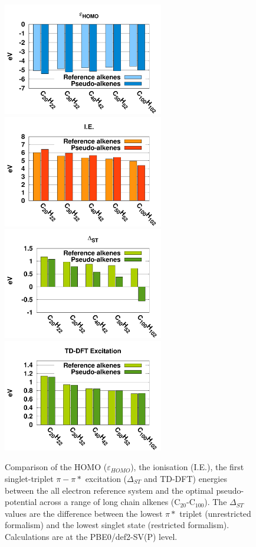 \documentclass[aip,reprint]{revtex4-1}
\begin{document}
\begin{figure}
\begin{center}
\includegraphics[width=7cm]{long_pbe0_homo}
\includegraphics[width=7cm]{long_pbe0_ie}
\includegraphics[width=7cm]{long_pbe0_st}
\includegraphics[width=7cm]{long_pbe0_tddft}
\end{center}

\caption{Comparison of the HOMO ($\varepsilon_{HOMO}$),
the ionisation (I.E.),
the first singlet-triplet $\pi-\pi*$ excitation ($\Delta_{ST}$ and TD-DFT) energies
between the
all electron reference system and the optimal pseudo-potential across a range of long chain alkenes (C\(_{20}\)-C\(_{100}\)).
The $\Delta_{ST}$ values are the difference
between the lowest $\pi*$  triplet (unrestricted formalism) and the lowest singlet state
(restricted formalism).
Calculations are at the PBE0/def2-SV(P) level.}
\label{fig:long_chain_graphs}
\end{figure}
\end{document}
